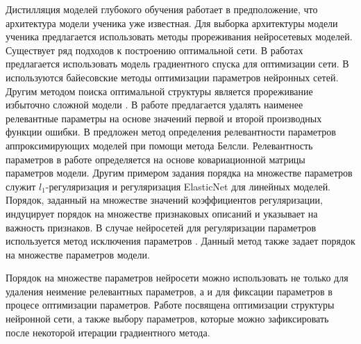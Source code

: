 Дистилляция моделей глубокого обучения работает в предположение, что архитектура модели ученика уже известная. Для выборка архитектуры модели ученика предлагается использовать методы прореживания нейросетевых моделей. Существует ряд подходов к построению оптимальной сети. В работах \cite{maclarin2015, luketina2015} предлагается использовать модель градиентного спуска для оптимизации сети. В \cite{molchanov2017} используются байесовские методы \cite{neal1995} оптимизации параметров нейронных сетей. Другим методом поиска оптимальной структуры является прореживание избыточно сложной модели \cite{cun1990, louizos2017, graves2011}. В работе \cite{cun1990} предлагается удалять наименее релевантные параметры на основе значений первой и второй производных функции ошибки. В \cite{grabovoy2019} предложен метод определения релевантности параметров аппроксимирующих моделей при помощи метода Белсли. Релевантность параметров в работе \cite{grabovoy2019} определяется на основе ковариационной матрицы параметров модели.
Другим примером задания порядка на множестве параметров служит $l_1$-регуляризация \cite{Tibshirani1996} и регуляризация ElasticNet \cite{Hastie2005} для линейных моделей.
Порядок, заданный на множестве значений коэффициентов регуляризации, индуцирует порядок на множестве признаковых описаний и указывает на важность признаков.
В случае нейросетей для регуляризации параметров используется метод исключения параметров \cite{srivastava2014, molchanov2017}.
Данный метод также задает порядок на множестве параметров модели.

Порядок на множестве параметров нейросети можно использовать не только для удаления неимение релевантных параметров, а и для фиксации параметров в процесе оптимизации параметров. Работе \cite{grabovoy2020} посвящена оптимизации структуры нейронной сети, а также выбору параметров, которые можно зафиксировать после некоторой итерации градиентного метода.